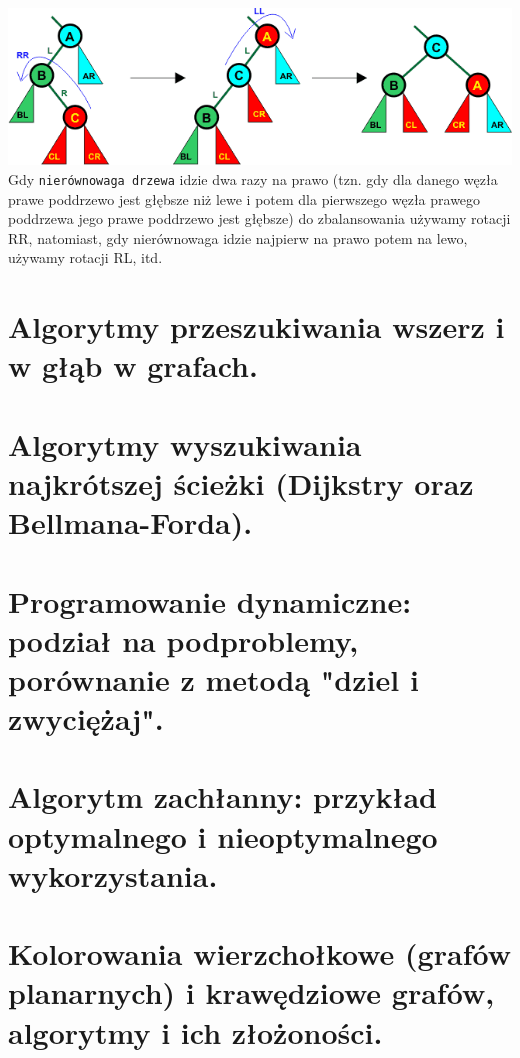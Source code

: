 \documentclass[12pt]{article}
\begin{document}
    \includegraphics[width=\linewidth]{graphics/avl-trees/lr-rotation.png} \\
    
    \noindent Gdy \texttt{nierównowaga drzewa} idzie dwa razy na prawo (tzn. gdy dla danego węzła prawe poddrzewo jest głębsze niż lewe i potem dla pierwszego węzła prawego poddrzewa jego prawe poddrzewo jest głębsze) do zbalansowania używamy rotacji RR, natomiast, gdy nierównowaga idzie najpierw na prawo potem na lewo, używamy rotacji RL, itd.
    
    \section{Algorytmy przeszukiwania wszerz i w głąb w grafach.}
    \section{Algorytmy wyszukiwania najkrótszej ścieżki (Dijkstry oraz Bellmana-Forda).}
    \section{Programowanie dynamiczne: podział na podproblemy, porównanie z metodą "dziel i zwyciężaj".}
    \section{Algorytm zachłanny: przykład optymalnego i nieoptymalnego wykorzystania.}
    
    \newpage
    
    \section{Kolorowania wierzchołkowe (grafów planarnych) i krawędziowe grafów, algorytmy i ich złożoności.}
    
\end{document}
